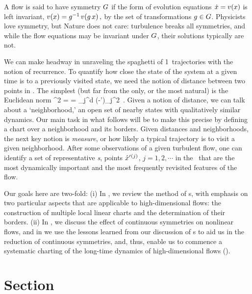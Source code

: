 \documentclass[aip,cha,reprint,
secnumarabic,
nofootinbib, tightenlines,
nobibnotes, showkeys, showpacs,
groupedaddress
]{revtex4-1}
\begin{document}
A flow is said to have symmetry $G$ if the form of evolution
equations $\dot{x} = v(x)$ is left invariant,
\(
v(x)=g^{-1} \, v(g \, x)
\,,
\) %
by the set of transformations $g \in {\ensuremath{G}}$. Physicists love
symmetry, but Nature does not care: turbulence breaks all
symmetries, and while the flow equations may be invariant under $G$,
their solutions typically are not.

We can make headway in unraveling the spaghetti
of 1\dmn\ trajectories with the notion of recurrence. To quantify how
close the state of the system at a given time is to a previously
visited state, we need the notion of distance between two points in
\statesp. The simplest (but far from the only, or the most natural) is
the Euclidean norm
\beq
  ^2  =  =
\sum_j^d
(\ssp-\ssp')_j^2
\,.
Given a notion of distance, we can talk about a `neighborhood,' an open
set of nearby states with qualitatively similar dynamics. Our main task
in what follows will be to make this precise by defining a chart over a
neighborhood and its borders. Given distances and neighborhoods, the next
key notion is  \emph{measure}, or how likely a typical trajectory is to
visit a given neighborhood. After some observations of a given turbulent
flow, one can identify a set of representative \emph{\template
s}, {points} ${\hat{x}'}{}^{(j)}$,
$j=1,2,\cdots$ in the \statesp\ that are the most dynamically important
and the most frequently revisited features of the flow.

Our goals here are two-fold:
(i) In , we review the method of \PoincSec s, with
    emphasis on two particular aspects that are applicable to high-dimensional flows:
    the construction of multiple local linear charts and the determination of
    their borders.
(ii) In , we discuss the effect of continuous symmetries on
    nonlinear flows, and in  we use the lessons learned
    from our discussion of \PoincSec s to aid us in the reduction of
    continuous symmetries, and, thus, enable us to commence a systematic
    charting of the long-time dynamics of high-dimensional flows
    ().


\section{Section}
\label{s:cut}
\end{document}
